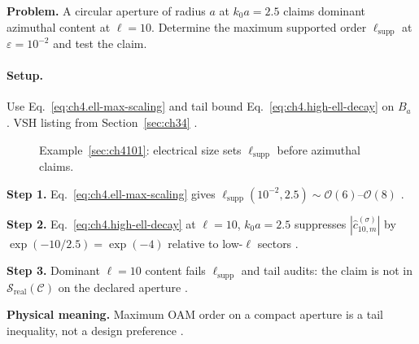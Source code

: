 \textbf{Problem.} A circular aperture of radius \(a\) at \(k_{0}a=2.5\) claims dominant azimuthal content at \(\ell=10\). Determine the
maximum supported order \(\ell_{\mathrm{supp}}\) at \(\varepsilon=10^{-2}\) and test the claim.

\paragraph{Setup.}
Use Eq.~\eqref{eq:ch4.ell-max-scaling} and tail bound Eq.~\eqref{eq:ch4.high-ell-decay} on \(B_{a}\) \cite{hansen1988,jackson1999,stratton1941}.
VSH listing from Section~\ref{sec:ch34} \cite{hansen1988}.

\begin{figure}[t]
\centering
{}
\caption{Example~\ref{sec:ch4101}: electrical size sets \(\ell_{\mathrm{supp}}\) before azimuthal claims.}
\label{fig:ch4.ex-ell-max-aperture}
\end{figure}

\textbf{Step 1.} Eq.~\eqref{eq:ch4.ell-max-scaling} gives \(\ell_{\mathrm{supp}}(10^{-2},2.5)\sim\mathcal{O}(6)\)--\(\mathcal{O}(8)\)
\cite{jackson1999,hansen1988,stratton1941}.

\textbf{Step 2.} Eq.~\eqref{eq:ch4.high-ell-decay} at \(\ell=10\), \(k_{0}a=2.5\) suppresses \(|\widehat{c}_{10,m}^{(\sigma)}|\) by
\(\exp(-10/2.5)=\exp(-4)\) relative to low-\(\ell\) sectors \cite{hansen1988,jackson1999}.

\textbf{Step 3.} Dominant \(\ell=10\) content fails \(\ell_{\mathrm{supp}}\) and tail audits: the claim is not in
\(\mathcal{S}_{\mathrm{real}}(\mathcal{C})\) on the declared aperture \cite{devaney2004,harrington2001}.

\textbf{Physical meaning.} Maximum OAM order on a compact aperture is a tail inequality, not a design preference \cite{hansen1988}.


